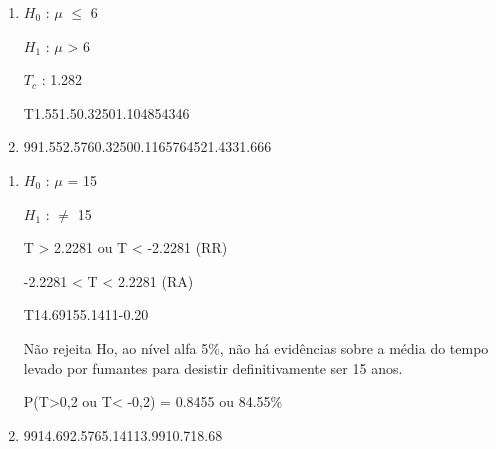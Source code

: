 \begin{question}
    
    \begin{enumerate}[label={\textbf{\alph*)}}]
        
        \item 
    
            $H_0$ : $\mu$ $\leq$ 6 

            $H_1$ : $\mu$ > 6 
        
            $T_c$ : 1.282

            \begin{formula7}
                {T}{1.55}{1.5}{0.32}{50}{1.104854346}
            \end{formula7}

        \item 
    
            \begin{formula1}
                {99}{1.55}{2.576}{0.32}{50}{0.116576452}{1.433}{1.666}
            \end{formula1}

    \end{enumerate}
\end{question}


\begin{question}
    
    \begin{enumerate}[label={\textbf{\alph*)}}]
        
        \item 
        
            $H_0$ : $\mu$ = 15 

            $H_1$ : $\neq$ 15 
        
            T > 2.2281 ou T < -2.2281 (RR)

            -2.2281 < T < 2.2281 (RA)

            \begin{formula7}
                {T}{14.69}{15}{5.14}{11}{-0.20}
            \end{formula7}

            Não rejeita Ho, ao nível alfa 5\%, não há evidências sobre a média do tempo 
            levado por fumantes para desistir definitivamente ser 15 anos. 

            P(T>0,2 ou T< -0,2) = 0.8455 ou 84.55\%
        \item 
    
            \begin{formula2}
                {99}{14.69}{2.576}{5.14}{11}{3.99}{10.7}{18.68}
            \end{formula2}

    \end{enumerate}
\end{question}

